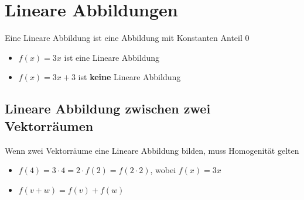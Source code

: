 \chapter{Lineare Abbildungen}

Eine Lineare Abbildung ist eine Abbildung mit Konstanten Anteil 0

\begin{itemize}
    \item $f(x) = 3x$ ist eine Lineare Abbildung
    \item $f(x) = 3x + 3$ ist \textbf{keine} Lineare Abbildung
\end{itemize}

\section{Lineare Abbildung zwischen zwei Vektorräumen}

Wenn zwei Vektorräume eine Lineare Abbildung bilden, muss Homogenität gelten

\begin{itemize}
    \item $f(4) = 3 \cdot 4 = 2 \cdot f(2) = f(2 \cdot 2)$, wobei $f(x) = 3x$
    \item $f(v + w) = f(v) + f(w)$
\end{itemize}